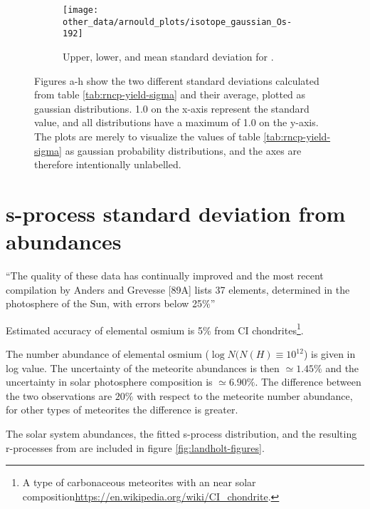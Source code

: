 \begin{figure}
\begin{subfigure}{\subfiglength}
  \end{subfigure}
  \begin{subfigure}{\subfiglength}
    \centering
    \texttt{[image: other\_data/arnould\_plots/isotope\_gaussian\_Os-192]}
    \caption{Upper, lower, and mean standard deviation for .}
  \end{subfigure}
  \caption[Difference in upper and lower deviation from ]{\label{fig:arnould-gauss-dist}
    Figures a-h show the two different standard deviations calculated from table \ref{tab:rncp-yield-sigma} and their average, plotted as gaussian distributions.
    1.0 on the x-axis represent the standard value, and all distributions have a maximum of 1.0 on the y-axis.
    The plots are merely to visualize the values of table \ref{tab:rncp-yield-sigma} as gaussian probability distributions, and the axes are therefore intentionally unlabelled.
  }
\end{figure}
\FloatBarrier

\section{s-process standard deviation from \sos abundances}
``The quality of these data has continually improved and the most recent compilation by
Anders and Grevesse [89A] lists 37 elements, determined in the photosphere of the Sun, with errors below
25\%''

Estimated accuracy of elemental osmium is 5\% from CI chondrites\footnote{A type of carbonaceous meteorites with an near solar composition\url{https://en.wikipedia.org/wiki/CI_chondrite}.}.

The number abundance of elemental osmium ($\log N(N(H)\equiv 10^{12}$) is given in log value. The uncertainty of the meteorite abundances is then $\simeq 1.45\%$ and the uncertainty in solar photosphere composition is $\simeq 6.90\%$. The difference between the two observations are $20\%$ with respect to the meteorite number abundance, for other types of meteorites the difference is greater.

The solar system abundances, the fitted s-process distribution, and the resulting r-processes from  are included in figure \ref{fig:landholt-figures}.

